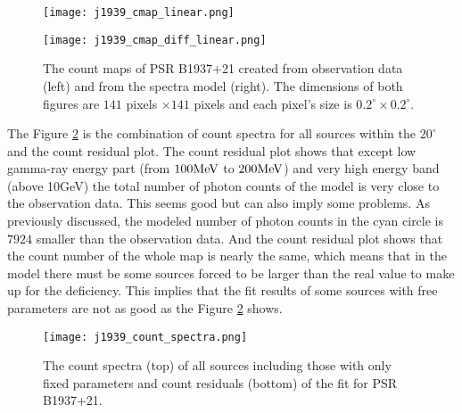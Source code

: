 \documentclass[12pt]{report}
\begin{document}
        \begin{figure}[!htp]
          \begin{center}
          \begin{minipage}{0.45\textwidth}
            \begin{center} 
              \texttt{[image: j1939\_cmap\_linear.png]}
            \end{center}
          \end{minipage}
          \begin{minipage}{0.45\textwidth}
            \begin{center}
              \texttt{[image: j1939\_cmap\_diff\_linear.png]}
            \end{center}
          \end{minipage}
          \end{center}

          \caption{The count maps of PSR B1937+21 created from observation 
            data (left) and from the spectra model (right). The dimensions
            of both figures are $141$ pixels $\times 141$ pixels and each pixel's size is
            $0.2^{\circ}\times0.2^{\circ}$.}
          \label{fig: j1939_count_map_diff}
        \end{figure}

        The Figure \ref{fig: j1939_count_spectra} is the combination of count spectra for 
        all sources within the $20^{\circ}$ and the count residual plot. The count residual 
        plot shows that except low gamma-ray energy part (from $100\hbox{MeV}$ to 
        $200\hbox{MeV}$) and very high energy band (above 10GeV) the total number of photon 
        counts of the model is very close to the observation data. This seems good but can 
        also imply some problems. As previously discussed, the modeled number of photon counts 
        in the cyan circle is $7924$ smaller than the observation data. And the count residual 
        plot shows that the count number of the whole map is nearly the same, which means that 
        in the model there must be some sources forced to be larger than the real value to make 
        up for the deficiency. This implies that the fit results of some sources with free 
        parameters are not as good as the Figure \ref{fig: j1939_count_spectra} shows. 
        
        \begin{figure}[!htp]
          \centering
          \texttt{[image: j1939\_count\_spectra.png]}
          \caption{The count spectra (top) of all sources including those with only fixed 
            parameters and count residuals (bottom) of the fit for PSR B1937+21.}
          \label{fig: j1939_count_spectra}
        \end{figure}
\end{document}
